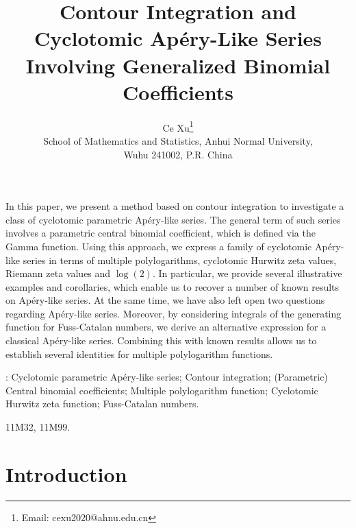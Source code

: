 \documentclass[11pt]{article}
\let\oldsection\section
\renewcommand\section{\setcounter{equation}{0}\oldsection}
\theoremstyle{plain}
\theoremstyle{definition}
\begin{document}
\title{\bf Contour Integration and Cyclotomic Ap\'ery-Like Series Involving Generalized Binomial Coefficients}
\author{
{Ce Xu\thanks{Email: cexu2020@ahnu.edu.cn}}\\[1mm]
\small School of Mathematics and Statistics, Anhui Normal University,\\ \small Wuhu 241002, P.R. China
}
\date{}
\maketitle

 In this paper, we present a method based on contour integration to investigate a class of cyclotomic parametric Ap\'ery-like series. The general term of such series involves a parametric central binomial coefficient, which is defined via the Gamma function. Using this approach, we express a family of cyclotomic Ap\'ery-like series in terms of multiple polylogarithms, cyclotomic Hurwitz zeta values, Riemann zeta values and $\log(2)$. In particular, we provide several illustrative examples and corollaries, which enable us to recover a number of known results on Ap\'ery-like series. At the same time, we have also left open two questions regarding Ap\'ery-like series. Moreover, by considering integrals of the generating function for Fuss-Catalan numbers, we derive an alternative expression for a classical Ap\'ery-like series. Combining this with known results allows us to establish several identities for multiple polylogarithm functions.

\medskip

: Cyclotomic parametric Ap\'ery-like series; Contour integration; (Parametric) Central binomial coefficients; Multiple polylogarithm function; Cyclotomic Hurwitz zeta function; Fuss-Catalan numbers.
\medskip

 11M32, 11M99.


\section{Introduction}
\end{document}

